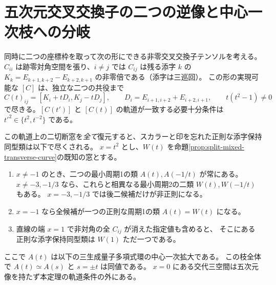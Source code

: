 \section{五次元交叉交換子の二つの逆像と中心一次枝への分岐}
\label{sec:marked-five-dimensional-bracket-fiber}
\begin{theorem}\label{thm:marked-five-dimensional-bracket-fiber}
同時に二つの座標枠を取って次の形にできる非零交叉交換子テンソルを考える。
$C_{ii}$ は跡零対角空間を張り、$i\ne j$ では $C_{ij}$ は残る添字 $k$ の
$K_k=E_{k+1,k+2}-E_{k+2,k+1}$ の非零倍である（添字は三巡回）。
この形の実現可能な $[C]$ は、独立な二つの共役まで
\[
 C(t)_{ij}=[K_i+tD_i,K_j-tD_j],\qquad
 D_i=E_{i+1,i+2}+E_{i+2,i+1},\qquad t(t^2-1)\ne0
\]
で尽きる。$[C(t')]$ と $[C(t)]$ の軌道が一致する必要十分条件は
$t'^2\in\{t^2,t^{-2}\}$ である。

この軌道上の二切断窓を\emph{全て}復元すると、スカラーと印を忘れた正則な添字保持同型類は以下で尽くされる。
$x=t^2$ とし、$W(t)$ を命題\ref{prop:split-mixed-transverse-curve}の既知の窓とする。
\begin{enumerate}
\item $x\ne-1$ のとき、二つの最小周期1の類 $A(t),A(-1/t)$ が常にある。
$x\ne-3,-1/3$ なら、これらと相異なる最小周期2の二類 $W(t),W(-1/t)$ もある。
$x=-3,-1/3$ では後二候補だけが非正則になる。
\item $x=-1$ なら全候補が一つの正則な周期1の類 $A(t)=W(t)$ になる。
\item 直線の端 $x=1$ で非対角の全 $C_{ij}$ が消えた指定値も含めると、
そこにある正則な添字保持同型類は $W(1)$ ただ一つである。
\end{enumerate}
ここで $A(t)$ は以下の三生成量子多項式環の中心一次拡大である。
この枝全体で $A(t)\simeq A(s)$ と $s=\pm t$ は同値である。
$x=0$ にある交代三空間は五次元像を持たず本定理の軌道条件の外にある。
\end{theorem}
